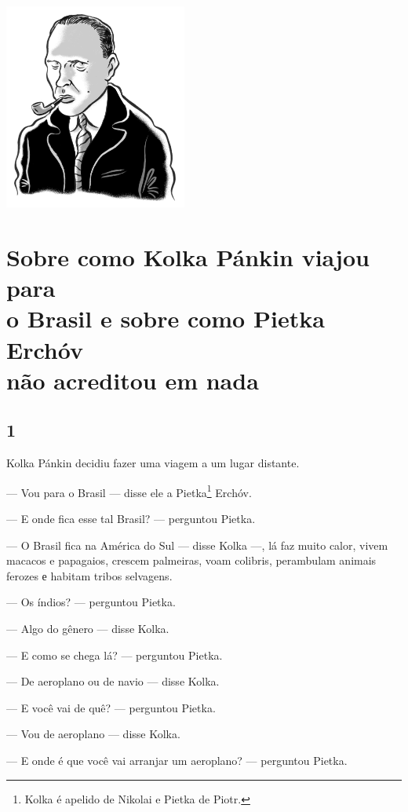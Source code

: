 \pagebreak
\thispagestyle{empty}
\mbox{}
\vfill
\begin{center}
\includegraphics[width=6cm]{./imgs/autor12.jpg}
\end{center}

\chapter{Sobre como Kolka Pánkin viajou para\\ o Brasil e sobre como Pietka Erchóv\\ não acreditou em nada}

\section{1}

\noindent{}Kolka Pánkin decidiu fazer uma viagem a um lugar distante.

--- Vou para o Brasil --- disse ele a Pietka\footnote{Kolka é apelido de Nikolai e Pietka de Piotr.} Erchóv.

--- E onde fica esse tal Brasil? --- perguntou Pietka.

--- O Brasil fica na América do Sul --- disse Kolka ---, lá faz muito
calor, vivem macacos e papagaios, crescem palmeiras, voam co­libris,
perambulam animais ferozes е habitam tribos selvagens.

--- Os índios? --- perguntou Pietka.

--- Algo do gênero --- disse Kolka.

--- E como se chega lá? --- perguntou Pietka.

--- De aeroplano ou de navio --- disse Kolka.

--- E você vai de quê? --- perguntou Pietka.

--- Vou de aeroplano --- disse Kolka.

--- E onde é que você vai arranjar um aeroplano? --- perguntou Pietka.

